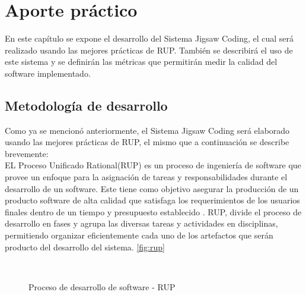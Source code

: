 \chapter{Aporte práctico}
\label{cap:aporte_practico}
En este capítulo se expone el desarrollo del Sistema Jigsaw Coding, el cual será realizado usando las mejores prácticas de RUP. También se describirá el uso de este sistema y se definirán las métricas  que permitirán medir la calidad del software implementado.

\section{Metodología de desarrollo}
Como ya se mencionó anteriormente, el Sistema Jigsaw Coding será elaborado usando las mejores prácticas de RUP, el mismo que a continuación se describe brevemente:\\

EL Proceso Unificado Rational(RUP) es un proceso de ingeniería de software que provee un enfoque para la asignación de tareas y responsabilidades durante el desarrollo de un software. Este tiene como objetivo asegurar la producción de un producto software de alta calidad que satisfaga los requerimientos de los usuarios finales dentro de un tiempo y presupuesto establecido \cite{rup_ibm_2014}. RUP, divide el proceso de desarrollo en fases y agrupa las diversas tareas y actividades en disciplinas, permitiendo organizar eficientemente cada uno de los artefactos que serán producto del desarrollo del sistema. \autoref{fig:rup}\\

\begin{figure}
  \centering
  \\
  \caption[RUP]{Proceso de desarrollo de software - RUP \protect\cite{rup_small}}\label{fig:rup}
\end{figure}

